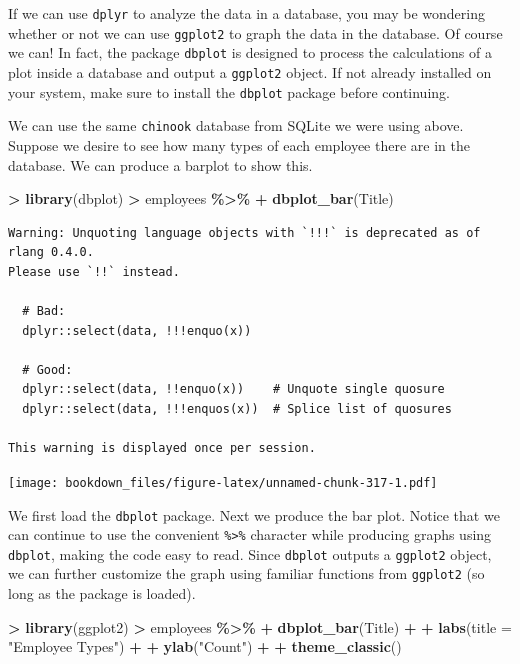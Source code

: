 \documentclass[
]{krantz}
\makeatletter
\newenvironment{Shaded}{\begin{snugshade}}{\end{snugshade}}
\newcommand{\DataTypeTok}[1]{\textcolor[rgb]{0.27,0.27,0.27}{#1}}
\newcommand{\KeywordTok}[1]{\textcolor[rgb]{0.27,0.27,0.27}{\textbf{#1}}}
\newcommand{\NormalTok}[1]{#1}
\newcommand{\OperatorTok}[1]{\textcolor[rgb]{0.43,0.43,0.43}{\textbf{#1}}}
\newcommand{\StringTok}[1]{\textcolor[rgb]{0.5,0.5,0.5}{#1}}
\newenvironment{kframe}{%
\medskip{}
\setlength{\fboxsep}{.8em}
 \def\at@end@of@kframe{}%
 \ifinner\ifhmode%
  \def\at@end@of@kframe{\end{minipage}}%
  \begin{minipage}{\columnwidth}%
 \fi\fi%
 \def\FrameCommand##1{\hskip\@totalleftmargin \hskip-\fboxsep
 \colorbox{shadecolor}{##1}\hskip-\fboxsep
     \hskip-\linewidth \hskip-\@totalleftmargin \hskip\columnwidth}%
 \MakeFramed {\advance\hsize-\width
   \@totalleftmargin\z@ \linewidth\hsize
   \@setminipage}}%
 {\par\unskip\endMakeFramed%
 \at@end@of@kframe}
\renewenvironment{Shaded}{\begin{kframe}}{\end{kframe}}
\makeatother
\begin{document}
If we can use \texttt{dplyr} to analyze the data in a database, you may be wondering whether or not we can use \texttt{ggplot2} to graph the data in the database. Of course we can! In fact, the package \texttt{dbplot} is designed to process the calculations of a plot inside a database and output a \texttt{ggplot2} object. If not already installed on your system, make sure to install the \texttt{dbplot} package before continuing.

We can use the same \texttt{chinook} database from SQLite we were using above. Suppose we desire to see how many types of each employee there are in the database. We can produce a barplot to show this.

\begin{Shaded}
\begin{Highlighting}[]
\OperatorTok{\textgreater{}}\StringTok{ }\KeywordTok{library}\NormalTok{(dbplot)}
\OperatorTok{\textgreater{}}\StringTok{ }\NormalTok{employees }\OperatorTok{\%\textgreater{}\%}\StringTok{ }
\OperatorTok{+}\StringTok{   }\KeywordTok{dbplot\_bar}\NormalTok{(Title)}
\end{Highlighting}
\end{Shaded}

\begin{verbatim}
Warning: Unquoting language objects with `!!!` is deprecated as of rlang 0.4.0.
Please use `!!` instead.

  # Bad:
  dplyr::select(data, !!!enquo(x))

  # Good:
  dplyr::select(data, !!enquo(x))    # Unquote single quosure
  dplyr::select(data, !!!enquos(x))  # Splice list of quosures

This warning is displayed once per session.
\end{verbatim}

\texttt{[image: bookdown\_files/figure-latex/unnamed-chunk-317-1.pdf]}

We first load the \texttt{dbplot} package. Next we produce the bar plot. Notice that we can continue to use the convenient \texttt{\%\textgreater{}\%} character while producing graphs using \texttt{dbplot}, making the code easy to read. Since \texttt{dbplot} outputs a \texttt{ggplot2} object, we can further customize the graph using familiar functions from \texttt{ggplot2} (so long as the package is loaded).

\begin{Shaded}
\begin{Highlighting}[]
\OperatorTok{\textgreater{}}\StringTok{ }\KeywordTok{library}\NormalTok{(ggplot2)}
\OperatorTok{\textgreater{}}\StringTok{ }\NormalTok{employees }\OperatorTok{\%\textgreater{}\%}\StringTok{ }
\OperatorTok{+}\StringTok{   }\KeywordTok{dbplot\_bar}\NormalTok{(Title) }\OperatorTok{+}\StringTok{ }
\OperatorTok{+}\StringTok{   }\KeywordTok{labs}\NormalTok{(}\DataTypeTok{title =} \StringTok{"Employee Types"}\NormalTok{) }\OperatorTok{+}\StringTok{ }
\OperatorTok{+}\StringTok{   }\KeywordTok{ylab}\NormalTok{(}\StringTok{"Count"}\NormalTok{) }\OperatorTok{+}\StringTok{ }
\OperatorTok{+}\StringTok{   }\KeywordTok{theme\_classic}\NormalTok{()}
\end{Highlighting}
\end{Shaded}
\end{document}
